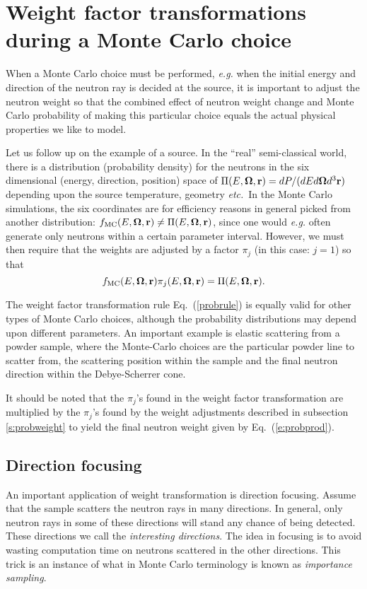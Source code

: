 \section{Weight factor transformations during a Monte Carlo
 choice}
When a Monte Carlo choice must be performed, {\em e.g.} when the
initial energy and direction of the neutron ray is decided at the source,
it is important to adjust the neutron weight so that the combined
effect of neutron weight change and Monte Carlo probability
of making this particular choice
equals the actual physical properties we like to model.

Let us follow up on the example of a source.
In the ``real'' semi-classical world, there is a distribution
(probability density) for the neutrons in the six dimensional
(energy, direction, position) space of
$\Pi(E,\mbox{\boldmath $\Omega$},{\bf r}) = dP/(dE d\mbox{\boldmath $\Omega$} d^3{\bf r})$ depending upon
the source temperature, geometry {\em etc.}\ In the
Monte Carlo simulations, the six coordinates are for efficiency reasons
in general picked from another distribution:
$f_{\rm MC}(E,\mbox{\boldmath $\Omega$},{\bf r}) \neq \Pi(E, \mbox{\boldmath $\Omega$},{\bf r})$,
since one would {\em e.g.} often generate
only neutrons within a certain parameter interval.
However, we must then require that the weights are adjusted
by a factor $\pi_j$ (in this case: $j=1$) so that
\begin{equation} \label{probrule}
f_{\rm MC}(E,\mbox{\boldmath $\Omega$},{\bf r}) \pi_j(E,\mbox{\boldmath $\Omega$},{\bf r})
 = \Pi(E,\mbox{\boldmath $\Omega$},{\bf r}) .
\end{equation}

The weight factor transformation rule Eq.~(\ref{probrule})
is equally valid for other types of Monte Carlo choices,
although the probability distributions may depend upon
different parameters. An important example
is elastic scattering from a powder sample,
where the Monte-Carlo choices are the particular powder line to scatter from,
the scattering position within the sample and the final neutron direction
within the Debye-Scherrer cone.

It should be noted that the $\pi_j$'s found in the weight factor
transformation are multiplied by the $\pi_j$'s found by the
weight adjustments described in
subsection \ref{s:probweight} to yield the final neutron
weight given by Eq.~(\ref{e:probprod}).

\subsection{Direction focusing}
\label{s:focus}
An important application of weight transformation is direction focusing.
Assume that the sample scatters the neutron rays in many directions.
In general, only neutron rays in some of these directions will
stand any chance of being detected. These directions we call
the {\em interesting directions}.
The idea in focusing is to avoid wasting computation time on
neutrons scattered in the other directions.
This trick is an instance of what in Monte Carlo terminology
is known as {\em importance sampling}. %

